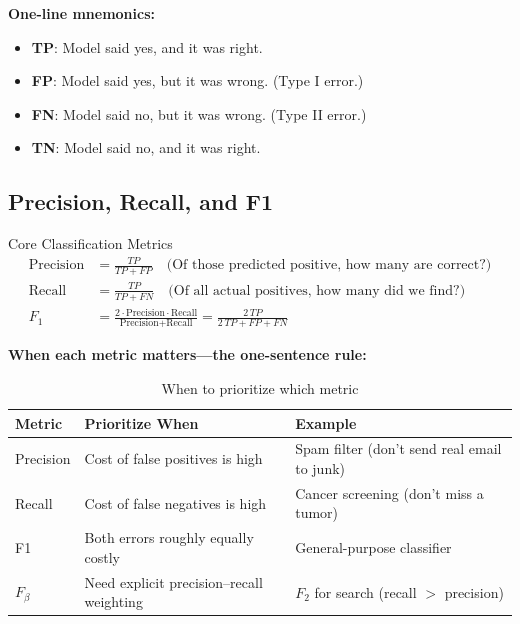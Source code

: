 \textbf{One-line mnemonics:}
\begin{itemize}
    \item \textbf{TP}: Model said yes, and it was right.
    \item \textbf{FP}: Model said yes, but it was wrong. (Type I error.)
    \item \textbf{FN}: Model said no, but it was wrong. (Type II error.)
    \item \textbf{TN}: Model said no, and it was right.
\end{itemize}

\subsection{Precision, Recall, and F1}

\begin{mathresult}{Core Classification Metrics}
\begin{align}
\text{Precision} &= \frac{TP}{TP + FP} \quad \text{(Of those predicted positive, how many are correct?)} \\[6pt]
\text{Recall} &= \frac{TP}{TP + FN} \quad \text{(Of all actual positives, how many did we find?)} \\[6pt]
F_1 &= \frac{2 \cdot \text{Precision} \cdot \text{Recall}}{\text{Precision} + \text{Recall}} = \frac{2\,TP}{2\,TP + FP + FN}
\end{align}
\end{mathresult}

\textbf{When each metric matters---the one-sentence rule:}

\begin{table}[H]
\centering
\caption{When to prioritize which metric}
\begin{tabularx}{\textwidth}{lXX}
\toprule
\textbf{Metric} & \textbf{Prioritize When} & \textbf{Example} \\
\midrule
Precision & Cost of false positives is high & Spam filter (don't send real email to junk) \\
Recall & Cost of false negatives is high & Cancer screening (don't miss a tumor) \\
F1 & Both errors roughly equally costly & General-purpose classifier \\
$F_\beta$ & Need explicit precision--recall weighting & $F_2$ for search (recall $>$ precision) \\
\bottomrule
\end{tabularx}
\end{table}

